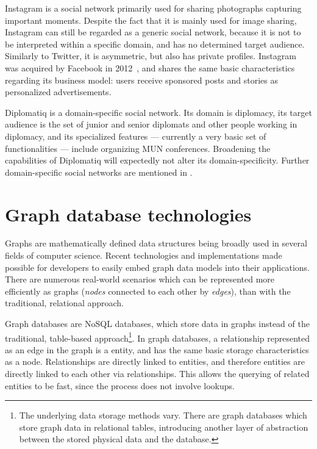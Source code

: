 Instagram is a social network primarily used for sharing photographs capturing important moments. Despite the fact that it is mainly used for image sharing, Instagram can still be regarded as a generic social network, because it is not to be interpreted within a specific domain, and has no determined target audience. Similarly to Twitter, it is asymmetric, but also has private profiles. Instagram was acquired by Facebook in 2012~\cite{facebookacquiresinstagram}, and shares the same basic characteristics regarding its business model: users receive sponsored posts and stories as personalized advertisements.

Diplomatiq is a domain-specific social network. Its domain is diplomacy, its target audience is the set of junior and senior diplomats and other people working in diplomacy, and its specialized features — currently a very basic set of functionalities — include organizing MUN conferences. Broadening the capabilities of Diplomatiq will expectedly not alter its domain-specificity. Further domain-specific social networks are mentioned in .

\section{Graph database technologies}

Graphs are mathematically defined data structures being broadly used in several fields of computer science. Recent technologies and implementations made possible for developers to easily embed graph data models into their applications. There are numerous real-world scenarios which can be represented more efficiently as graphs (\emph{nodes} connected to each other by \emph{edges}), than with the traditional, relational approach.

Graph databases are NoSQL databases, which store data in graphs instead of the traditional, table-based approach\footnote{The underlying data storage methods vary. There are graph databases which store graph data in relational tables, introducing another layer of abstraction between the stored physical data and the database.}. In graph databases, a relationship represented as an edge in the graph is a  entity, and has the same basic storage characteristics as a node. Relationships are directly linked to entities, and therefore entities are directly linked to each other via relationships. This allows the querying of related entities to be fast, since the process does not involve lookups.

